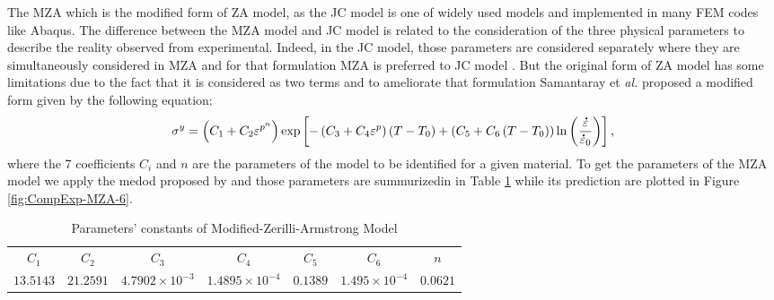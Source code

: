 \documentclass[twoside,english,1p,final,sort&compress]{elsarticle}
\makeatletter
\theoremstyle{plain}
\DeclareRobustCommand{\mdot}[1]{\accentset{\mbox{\bfseries .}}{#1}}
\DeclareRobustCommand{\eal}{et \emph{al.}\@\xspace}
\makeatother
\begin{document}
The MZA which is the modified form of ZA model, as the JC model is one of widely used models and implemented in many FEM codes like Abaqus.
The difference between the MZA model and JC model is related to the consideration of the three physical parameters to describe the reality observed from experimental.
Indeed, in the JC model, those parameters are considered separately where they are simultaneously considered in MZA and for that formulation MZA is preferred to JC model \cite{Hull-2011}.
But the original form of ZA model has some limitations due to the fact that it is considered as two terms and to ameliorate that formulation Samantaray \eal \cite{Samantaray-2009} proposed a modified form given by the following equation:
\begin{equation}
\label{eq:MZA-model}
\sigma^y = \left(C_{1}+C_{2}\varepsilon^{p^n}\right) \exp\left[-\left(C_{3}+C_{4}\varepsilon^p\right)\left(T-T_0\right) + \left(C_{5}+C_{6}\left(T-T_0\right)\right)\ln\left( \frac{\mdot\varepsilon}{\mdot{\varepsilon}_0}\right)\right],
\end{equation}
where the 7 coefficients $C_i$ and $n$ are the parameters of the model to be identified for a given material.
To get the parameters of the MZA model we apply the medod proposed by \cite{Samantaray-2009} and those parameters are summurizedin in Table \ref{tab:MZA} while its prediction are plotted in Figure \ref{fig:CompExp-MZA-6}.
\begin{table}[h!]
\centering{}
\caption{Parameters' constants of Modified-Zerilli-Armstrong Model}
\begin{tabular}{ccccccc}
	\hline
	  $C_1$   &   $C_2$   &         $C_3$          &         $C_4$          &  $C_5$   &         $C_6$         &   $n$    \\
	$13.5143$ & $21.2591$ & $4.7902\times 10^{-3}$ & $1.4895\times 10^{-4}$ & $0.1389$ & $1.495\times 10^{-4}$ & $0.0621$ \\ \hline
\end{tabular}
\label{tab:MZA}
\end{table}
\end{document}

